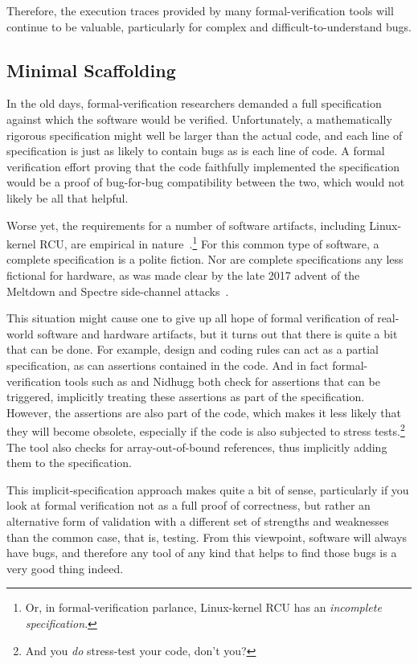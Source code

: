 Therefore, the execution traces provided
by many formal-verification tools will continue to be valuable,
particularly for complex and difficult-to-understand bugs.

\subsection{Minimal Scaffolding}
\label{sec:future:Minimal Scaffolding}

In the old days, formal-verification researchers demanded a full
specification against which the software would be verified.
Unfortunately, a mathematically rigorous specification might well
be larger than the actual code, and each line of specification
is just as likely to contain bugs as is each line of code.
A formal verification effort proving that the code faithfully
implemented the specification would be a proof of bug-for-bug
compatibility between the two, which would not likely be all
that helpful.

Worse yet, the requirements for a number of software artifacts,
including Linux-kernel RCU, are empirical in
nature~\cite{PaulEMcKenney2015RCUreqts1,PaulEMcKenney2015RCUreqts2,PaulEMcKenney2015RCUreqts3}.\footnote{
	Or, in formal-verification parlance, Linux-kernel RCU has an
	\emph{incomplete specification}.}
For this common type of software, a complete specification is a
polite fiction.
Nor are complete specifications any less fictional for hardware,
as was made clear by the late 2017 advent of the Meltdown and Spectre
side-channel attacks~\cite{JannHorn2018MeltdownSpectre}.

This situation might cause one to give up all hope of formal verification
of real-world software and hardware artifacts, but it turns out that there is
quite a bit that can be done.
For example, design and coding rules can act as a partial specification,
as can assertions contained in the code.
And in fact formal-verification tools such as  and Nidhugg
both check for assertions that can be triggered, implicitly treating
these assertions as part of the specification.
However, the assertions are also part of the code, which makes it less
likely that they will become obsolete, especially if the code is
also subjected to stress tests.\footnote{
	And you \emph{do} stress-test your code, don't you?}
The  tool also checks for array-out-of-bound references,
thus implicitly adding them to the specification.

This implicit-specification approach makes quite a bit of sense, particularly
if you look at formal verification not as a full proof of correctness,
but rather an alternative form of validation with a different set of
strengths and weaknesses than the common case, that is, testing.
From this viewpoint, software will always have bugs, and therefore any
tool of any kind that helps to find those bugs is a very good thing
indeed.

